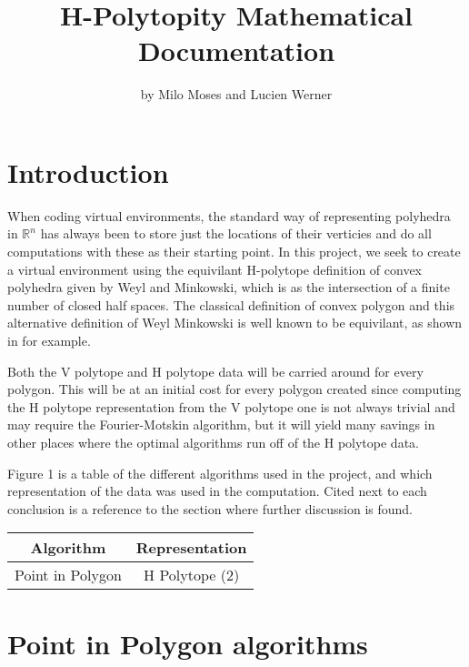 \documentclass{article}
\title{H-Polytopity Mathematical Documentation}
\author{by Milo Moses and Lucien Werner}
\theoremstyle{definition}
\begin{document}
\maketitle

\tableofcontents
\newcommand{\R}{\mathbb{R}}


\section{Introduction}

When coding virtual environments, the standard way of representing polyhedra in $\R^n$ has always been to store just the locations of their verticies and do all computations with these as their starting point. In this project, we seek to create a virtual environment using the equivilant H-polytope definition of convex polyhedra given by Weyl and Minkowski, which is as the intersection of a finite number of closed half spaces. The classical definition of convex polygon and this alternative definition of Weyl Minkowski is well known to be equivilant, as shown in \cite{gallier2003polyhedra} for example.

Both the V polytope and H polytope data will be carried around for every polygon. This will be at an initial cost for every polygon created since computing the H polytope representation from the V polytope one is not always trivial and may require the Fourier-Motskin algorithm, but it will yield many savings in other places where the optimal algorithms run off of the H polytope data.

Figure 1 is a table of the different algorithms used in the project, and which representation of the data was used in the computation. Cited next to each conclusion is a reference to the section where further discussion is found.

\begin{center}
 \begin{tabular}{|| c| c||} 
 \hline
 Algorithm & Representation \\ [0.5ex] 
 \hline\hline
Point in Polygon & H Polytope (2) \\ 
 \hline
 \hline
\end{tabular}
\end{center}

\section{Point in Polygon algorithms}
\end{document}
